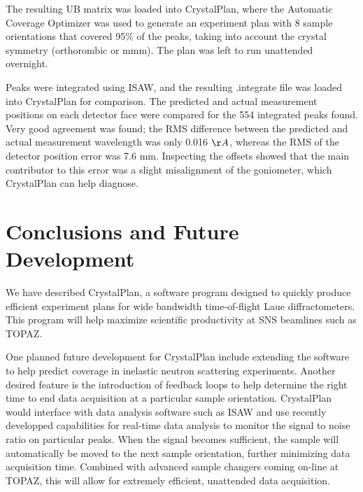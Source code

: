 \documentclass[draft]{iucr}              %
\begin{document}
The resulting UB matrix was loaded into CrystalPlan, where the Automatic
Coverage Optimizer was used to generate an experiment plan with 8 sample
orientations that covered 95\% of the peaks, taking into account the crystal
symmetry (orthorombic or mmm). The plan was left to run unattended overnight.    

Peaks were integrated using ISAW, and the resulting .integrate file was loaded
into CrystalPlan for comparison. The predicted and actual measurement
positions on each detector face were compared for the 554 integrated peaks
found. Very good agreement was found; the
RMS difference between the predicted and actual measurement wavelength was only
0.016 $\AA$, whereas the RMS of the detector position error was
7.6 mm. Inspecting the offsets showed that the main contributor to this error was a
slight misalignment of the goniometer, which CrystalPlan can help diagnose. 




\section{Conclusions and Future Development}

We have described CrystalPlan, a software program designed to quickly produce
efficient experiment plans for wide bandwidth time-of-flight Laue
diffractometers. This program will help maximize scientific productivity at SNS
beamlines such as TOPAZ.

One planned future development for CrystalPlan include extending the software
to help predict coverage in inelastic neutron scattering experiments. Another
desired feature is the introduction of feedback loops to help determine the
right time to end data acquisition at a particular sample orientation.
CrystalPlan would interface with data analysis software such as ISAW and use
recently developped capabilities for real-time data analysis to monitor
the  signal to noise ratio on particular peaks. When the signal becomes
sufficient, the sample will automatically be moved to the next sample
orientation, further minimizing data acquisition time. Combined with advanced
sample changers coming on-line at TOPAZ, this will allow for extremely
efficient, unattended data acquisition.
\end{document}
